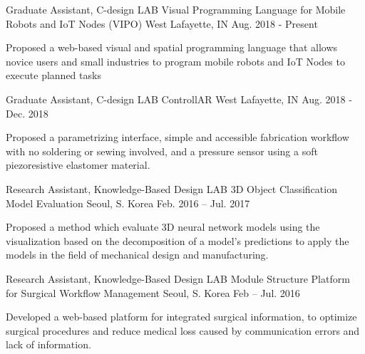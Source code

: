 \begin{cventries}

\cventry
{Graduate Assistant, C-design LAB} %
{Visual Programming Language for Mobile Robots and IoT Nodes (VIPO)} %
{West Lafayette, IN} %
{Aug. 2018 - Present} %
{ %
\begin{cvitems}
\item {Proposed a web-based visual and spatial programming language that allows novice users and small industries to program mobile robots and IoT Nodes to execute planned tasks}
\end{cvitems} 
}


\cventry
{Graduate Assistant, C-design LAB} %
{ControllAR} %
{West Lafayette, IN} %
{Aug. 2018 - Dec. 2018} %
{ %
\begin{cvitems}
\item {Proposed a parametrizing interface, simple and accessible fabrication workflow with no soldering or sewing involved, and a pressure sensor using a soft piezoresistive elastomer material.}
\end{cvitems}
}


\cventry
{Research Assistant, Knowledge-Based Design LAB} %
{3D Object Classification Model Evaluation} %
{Seoul, S. Korea} %
{Feb. 2016 – Jul. 2017} %
{ %
\begin{cvitems}
\item {Proposed a method which evaluate 3D neural network models using the visualization based on the decomposition of a model’s predictions to apply the models in the field of mechanical design and manufacturing.}
\end{cvitems}
}

\cventry
{Research Assistant, Knowledge-Based Design LAB} %
{Module Structure Platform for Surgical Workflow Management} %
{Seoul, S. Korea} %
{Feb – Jul. 2016} %
{ %
\begin{cvitems}
\item {Developed a web-based platform for integrated surgical information, to optimize surgical procedures and reduce medical loss caused by communication errors and lack of information.}
\end{cvitems}
}


\end{cventries}